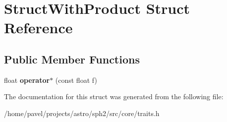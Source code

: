 \hypertarget{structStructWithProduct}{}\section{Struct\+With\+Product Struct Reference}
\label{structStructWithProduct}
\subsection*{Public Member Functions}
\begin{DoxyCompactItemize}
\item 
\hypertarget{structStructWithProduct_ac47b5791264d784d663429e49845f0cb}{}\label{structStructWithProduct_ac47b5791264d784d663429e49845f0cb} 
float {\bfseries operator$\ast$} (const float f)
\end{DoxyCompactItemize}


The documentation for this struct was generated from the following file\+:\begin{DoxyCompactItemize}
\item 
/home/pavel/projects/astro/sph2/src/core/traits.\+h\end{DoxyCompactItemize}
